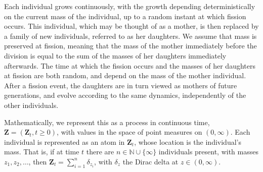 \documentclass[11pt]{article}
\theoremstyle{definition}
\numberwithin{equation}{section}
\numberwithin{figure}{section}
\numberwithin{table}{section}
\newcommand\Zz{\mathbf{Z}}
\newcommand\NN{\mathbb{N}}
\begin{document}
Each individual grows continuously, with the growth depending deterministically on the current mass of the individual, up to a random instant at which fission occurs. This individual, which may be thought of as a mother, is then replaced by a family of new individuals, referred to as her daughters. We assume that mass is preserved at fission, meaning that the mass of the mother immediately before the division is equal to the sum of the masses of her daughters immediately afterwards. The time at which the fission occurs and the masses of her daughters at fission are both random, and depend on the mass of the mother individual. After a fission event, the daughters are in turn viewed as mothers of future generations, and evolve according to the same dynamics, independently of the other individuals.

Mathematically, we represent this as a process in continuous time, $\Zz=(\Zz_t, t\geq 0)$, with values in the space of point measures on $(0,\infty)$. Each individual is represented as an atom in $\Zz_t$, whose location is the individual's mass. That is, if at time $t$ there are $n\in \NN \cup\{\infty\}$ individuals present, with masses $z_1,z_2,\dotsc$, then $\Zz_t = \sum_{i=1}^n \delta_{z_i}$, with $\delta_z$ the Dirac delta at $z \in (0,\infty)$.
\end{document}
